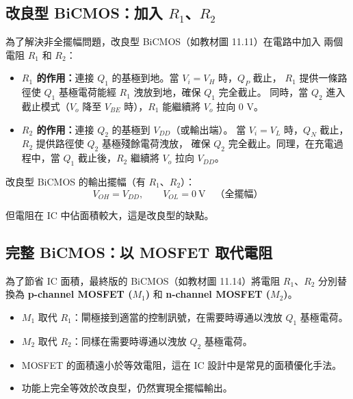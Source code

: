 \documentclass[12pt]{article}
\begin{document}
\subsection*{改良型 BiCMOS：加入 $R_1$、$R_2$}

為了解決非全擺幅問題，改良型 BiCMOS（如教材圖 11.11）在電路中加入
兩個電阻 $R_1$ 和 $R_2$：

\begin{itemize}[leftmargin=2em,itemsep=3pt]
\item \textbf{$R_1$ 的作用：}連接 $Q_1$ 的基極到地。當 $V_i = V_H$ 時，$Q_P$ 截止，
  $R_1$ 提供一條路徑使 $Q_1$ 基極電荷能經 $R_1$ 洩放到地，確保 $Q_1$ 完全截止。
  同時，當 $Q_2$ 進入截止模式（$V_o$ 降至 $V_{BE}$ 時），$R_1$ 能繼續將 $V_o$
  拉向 0 V。
\item \textbf{$R_2$ 的作用：}連接 $Q_2$ 的基極到 $V_{DD}$（或輸出端）。
  當 $V_i = V_L$ 時，$Q_N$ 截止，$R_2$ 提供路徑使 $Q_2$ 基極殘餘電荷洩放，
  確保 $Q_2$ 完全截止。同理，在充電過程中，當 $Q_1$ 截止後，$R_2$ 繼續將
  $V_o$ 拉向 $V_{DD}$。
\end{itemize}

\begin{formulabox}
改良型 BiCMOS 的輸出擺幅（有 $R_1$、$R_2$）：
\[
V_{OH} = V_{DD},\qquad V_{OL} = 0\ \text{V} \quad \text{（全擺幅）}
\]
\end{formulabox}

\noindent
但電阻在 IC 中佔面積較大，這是改良型的缺點。

\subsection*{完整 BiCMOS：以 MOSFET 取代電阻}

為了節省 IC 面積，最終版的 BiCMOS（如教材圖 11.14）將電阻 $R_1$、$R_2$
分別替換為 \textbf{p-channel MOSFET ($M_1$)} 和 \textbf{n-channel MOSFET ($M_2$)}。

\begin{itemize}[leftmargin=2em,itemsep=3pt]
\item $M_1$ 取代 $R_1$：閘極接到適當的控制訊號，在需要時導通以洩放 $Q_1$ 基極電荷。
\item $M_2$ 取代 $R_2$：同樣在需要時導通以洩放 $Q_2$ 基極電荷。
\item MOSFET 的面積遠小於等效電阻，這在 IC 設計中是常見的面積優化手法。
\item 功能上完全等效於改良型，仍然實現全擺幅輸出。
\end{itemize}
\end{document}
